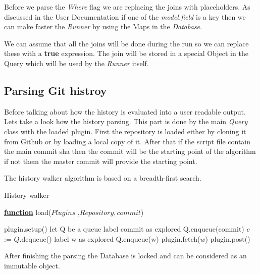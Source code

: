 Before we parse the \textit{Where} flag we are replacing the joins with placeholders.
As discussed in the User Documentation if one of the \textit{model.field} is a key then
we can make faster the \textit{Runner} by using the Maps in the \textit{Database}.

We can assume that all the joins will be done during the run so we can replace these with a
\textbf{true} expression. The join will be stored in a special Object in the Query which will
be used by the \textit{Runner} itself.

\newpage
\subsection{Parsing Git histroy}

Before talking about how the history is evaluated into a user readable output. Lets take a look
how the history parsing. This part is done by the main \textit{Query} class with the loaded
plugin. First the repository is loaded either by cloning it from Github or by loading a local copy of it. After that if the script file contain the main commit sha then the commit will be the starting point of the algorithm if not them the master commit will provide the starting point.

The history walker algorithm is based on a breadth-first search.

\begin{algorithm}[H]
	\caption{History walker} 
	\label{alg:ibb} 
	\textbf{\underline{function}} load($Plugins$ ,$Repository, commit$)
	\begin{algorithmic}[1] %
		\State plugin.setup()
		\EndFor
		\State let Q be a queue
		\State label commit as explored
		\State Q.enqueue(commit)
		\State $c$ := $Q$.dequeue()
		\State label w as explored  
		\State Q.enqueue(w) 
		\State plugin.fetch($w$)
		\EndFor 
		\EndIf
		\EndFor
		\EndWhile
		\State plugin.post()
		\EndFor
		\end{algorithmic}
\end{algorithm}

After finishing the parsing the Database is locked and can be considered as an immutable object. 

\newpage

